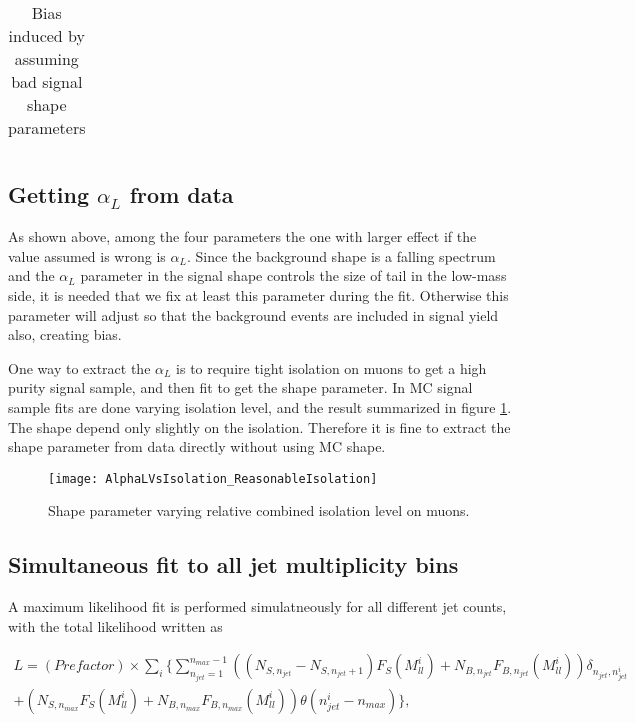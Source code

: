 \documentclass{cmspaper}
\begin{document}
\begin{table}[htdp]
 \caption{Bias induced by assuming bad signal shape parameters}
 \centering
 \begin{tabular}{|c|c|c|c|c|c|}
 \hline
 \end{tabular}
 \label{Table_BadShapeSummary}
\end{table}

\subsection{Getting $\alpha_L$ from data}

As shown above, among the four parameters the one with larger effect if the value assumed is wrong is $\alpha_L$.
Since the background shape is a falling spectrum and the $\alpha_L$ parameter in the signal shape controls the size of tail in the low-mass side,
it is needed that we fix at least this parameter during the fit.
Otherwise this parameter will adjust so that the background events are included in signal yield also, creating bias.

One way to extract the $\alpha_L$ is to require tight isolation on muons to get a high purity signal sample, and then fit to get the shape parameter.
In MC signal sample fits are done varying isolation level, and the result summarized in figure \ref{Figure_AlphaLVsIsolation}.
The shape depend only slightly on the isolation.
Therefore it is fine to extract the shape parameter from data directly without using MC shape.

\begin{figure}
   \begin{center}
   \texttt{[image: AlphaLVsIsolation\_ReasonableIsolation]}
   \caption{Shape parameter varying relative combined isolation level on muons.}
   \label{Figure_AlphaLVsIsolation}
   \end{center}
\end{figure}

\subsection{Simultaneous fit to all jet multiplicity bins}

A maximum likelihood fit is performed simulatneously for all different jet counts, with the total likelihood written as

\begin{eqnarray}
L = (Prefactor) \times \displaystyle\sum_i \{ \displaystyle\sum_{n_{jet}=1}^{n_{max} - 1} \left( (N_{S, n_{jet}} - N_{S, n_{jet} + 1}) F_S(M_{ll}^i) + N_{B, n_{jet}} F_{B, n_{jet}}(M_{ll}^i) \right)
\delta_{n_{jet}, n_{jet}^i}\nonumber\\
+ \left( N_{S, n_{max}} F_S(M_{ll}^i) + N_{B, n_{max}} F_{B, n_{max}}(M_{ll}^i) \right) \theta(n_{jet}^i - n_{max}) \},
\nonumber
\end{eqnarray}
\end{document}
